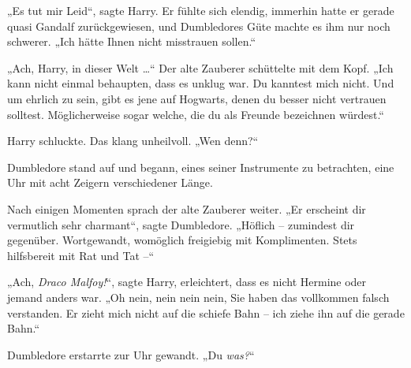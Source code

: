 „Es tut mir Leid“, sagte Harry. Er fühlte sich elendig, immerhin hatte er gerade quasi Gandalf zurückgewiesen, und Dumbledores Güte machte es ihm nur noch schwerer. „Ich hätte Ihnen nicht misstrauen sollen.“

„Ach, Harry, in dieser Welt …“ Der alte Zauberer schüttelte mit dem Kopf. „Ich kann nicht einmal behaupten, dass es unklug war. Du kanntest mich nicht. Und um ehrlich zu sein, gibt es jene auf Hogwarts, denen du besser nicht vertrauen solltest. Möglicherweise sogar welche, die du als Freunde bezeichnen würdest.“

Harry schluckte. Das klang unheilvoll. „Wen denn?“

Dumbledore stand auf und begann, eines seiner Instrumente zu betrachten, eine Uhr mit acht Zeigern verschiedener Länge.

Nach einigen Momenten sprach der alte Zauberer weiter. „Er erscheint dir vermutlich sehr charmant“, sagte Dumbledore. „Höflich – zumindest dir gegenüber. Wortgewandt, womöglich freigiebig mit Komplimenten. Stets hilfsbereit mit Rat und Tat –“

„Ach, \emph{Draco Malfoy!}“, sagte Harry, erleichtert, dass es nicht Hermine oder jemand anders war. „Oh nein, nein nein nein, Sie haben das vollkommen falsch verstanden. Er zieht mich nicht auf die schiefe Bahn – ich ziehe ihn auf die gerade Bahn.“

Dumbledore erstarrte zur Uhr gewandt. „Du \emph{was?}“

